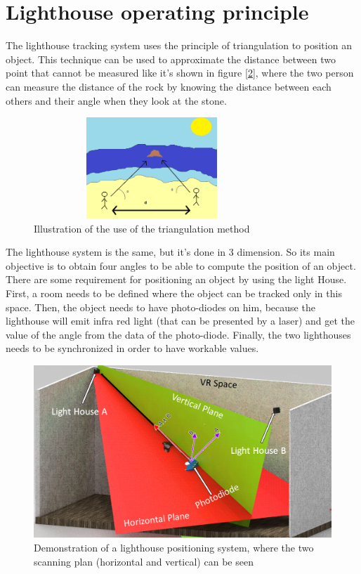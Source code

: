 \documentclass{vldb}
\begin{document}
\section{Lighthouse operating principle}
The lighthouse tracking system uses the principle of triangulation to position an object. This technique can be used to approximate the distance between two point that cannot be measured like it's shown in figure [\ref{plage}], where the two person can measure the distance of the rock by knowing the distance between each others and their angle when they look at the stone.
\begin{figure}
\centering
\includegraphics[width=3.5in,height=1.5in]{Image/plage.png}
\caption{Illustration of the use of the triangulation method}
\label{plage}
\end{figure}
The lighthouse system is the same, but it's done in 3 dimension. So its main objective is to obtain four angles to be able to compute the position of an object. 
There are some requirement for positioning an object by using the light House. First, a room needs to be defined where the object can be tracked only in this space. Then, the object needs to have photo-diodes on him, because the lighthouse will emit infra red light (that can be presented by a laser) and get the value of the angle from the data of the photo-diode. Finally, the two lighthouses needs to be synchronized in order to have workable values.
\bigbreak
\begin{figure}
\centering
\includegraphics[width=1.0\columnwidth]{Image/LH1.png}
\caption{Demonstration of a lighthouse positioning system, where the two scanning plan (horizontal and vertical) can be seen}
\label{plage}
\end{figure}
\end{document}
